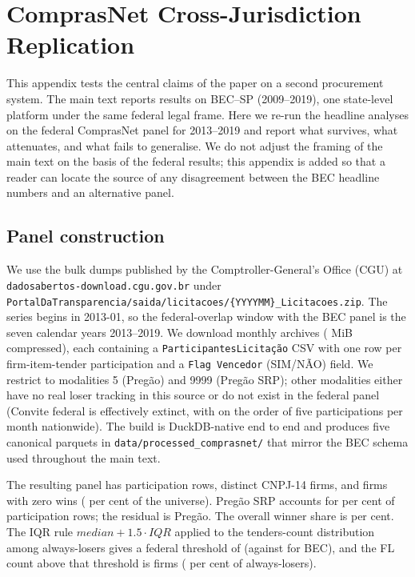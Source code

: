 \section{ComprasNet Cross-Jurisdiction Replication}
\label{app:comprasnet_submission}

This appendix tests the central claims of the paper on a second
procurement system. The main text reports results on BEC--SP
(2009--2019), one state-level platform under the same federal
legal frame. Here we re-run the headline analyses on the federal
ComprasNet panel for 2013--2019 and report what survives, what
attenuates, and what fails to generalise. We do not adjust the
framing of the main text on the basis of the federal results;
this appendix is added so that a reader can locate the source of
any disagreement between the BEC headline numbers and an
alternative panel.

\subsection{Panel construction}
\label{app:comprasnet_panel}

We use the bulk dumps published by the Comptroller-General's
Office (CGU) at \texttt{dadosabertos-download.cgu.gov.br} under
\texttt{Portal\-Da\-Transparencia/saida/licitacoes/\{YYYYMM\}\_Licitacoes.zip}.
The series begins in 2013-01, so the federal-overlap window with
the BEC panel is the seven calendar years 2013--2019. We download
\valFedZipMonths{} monthly archives (\valFedAcquireMiBcompressed{}
MiB compressed), each containing a \texttt{ParticipantesLicitação}
CSV with one row per firm-item-tender participation and a
\texttt{Flag\,Vencedor} (SIM/NÃO) field. We restrict to modalities
5 (Pregão) and 9999 (Pregão SRP); other modalities either have no
real loser tracking in this source or do not exist in the federal
panel (Convite federal is effectively extinct, with on the order
of five participations per month nationwide). The build is
DuckDB-native end to end and produces five canonical parquets in
\texttt{data/processed\_comprasnet/} that mirror the BEC schema
used throughout the main text.

The resulting panel has \valFedPanelRows{} participation rows,
\valFedFirms{} distinct CNPJ-14 firms, and \valFedAlwaysLosers{}
firms with zero wins (\valFedALshare{} per cent of the universe).
Pregão SRP accounts for \valFedSharePregaoSRP{} per cent of
participation rows; the residual is Pregão. The overall winner
share is \valFedWinRateGlobal{} per cent. The IQR rule
$\textit{median} + 1.5 \cdot \textit{IQR}$ applied to the
tenders-count distribution among always-losers gives a federal
threshold of \valFedFLthreshold{} (against \valBECalShare{} for
BEC), and the FL count above that threshold is
\valFedFLcount{} firms (\valFedFLshare{} per cent of
always-losers).

